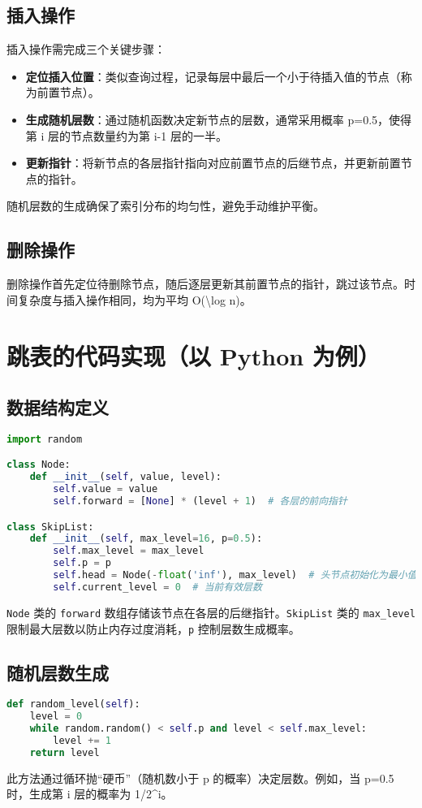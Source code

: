 \section{插入操作}
插入操作需完成三个关键步骤：\par
\begin{itemize}
\item \textbf{定位插入位置}：类似查询过程，记录每层中最后一个小于待插入值的节点（称为前置节点）。
\item \textbf{生成随机层数}：通过随机函数决定新节点的层数，通常采用概率 p=0.5，使得第 i 层的节点数量约为第 i-1 层的一半。
\item \textbf{更新指针}：将新节点的各层指针指向对应前置节点的后继节点，并更新前置节点的指针。
\end{itemize}
随机层数的生成确保了索引分布的均匀性，避免手动维护平衡。\par
\section{删除操作}
删除操作首先定位待删除节点，随后逐层更新其前置节点的指针，跳过该节点。时间复杂度与插入操作相同，均为平均 O(\textbackslash{}log n)。\par
\chapter{跳表的代码实现（以 Python 为例）}
\section{数据结构定义}
\begin{lstlisting}[language=python]
import random  

class Node:  
    def __init__(self, value, level):  
        self.value = value  
        self.forward = [None] * (level + 1)  # 各层的前向指针  

class SkipList:  
    def __init__(self, max_level=16, p=0.5):  
        self.max_level = max_level  
        self.p = p  
        self.head = Node(-float('inf'), max_level)  # 头节点初始化为最小值  
        self.current_level = 0  # 当前有效层数  
\end{lstlisting}
\texttt{Node} 类的 \texttt{forward} 数组存储该节点在各层的后继指针。\texttt{SkipList} 类的 \texttt{max\_{}level} 限制最大层数以防止内存过度消耗，\texttt{p} 控制层数生成概率。\par
\section{随机层数生成}
\begin{lstlisting}[language=python]
def random_level(self):  
    level = 0  
    while random.random() < self.p and level < self.max_level:  
        level += 1  
    return level  
\end{lstlisting}
此方法通过循环抛“硬币”（随机数小于 p 的概率）决定层数。例如，当 p=0.5 时，生成第 i 层的概率为 1/2\^{}i。\par
